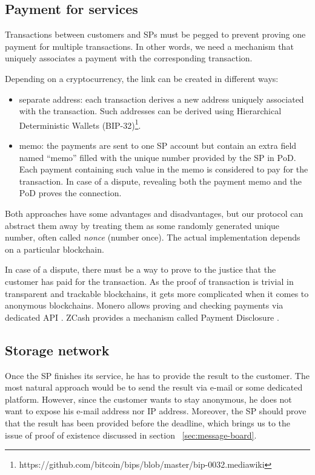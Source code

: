 \documentclass{ieeeaccess}
\begin{document}
\subsection{Payment for services}\label{payment-for-services}
Transactions between customers and SPs must be pegged to prevent proving one payment for multiple transactions. In other
words, we need a mechanism that uniquely associates a payment with the corresponding transaction.

Depending on a cryptocurrency, the link can be created in different
ways:
\begin{itemize}

\item separate address: each transaction derives a new address uniquely associated with the transaction. Such addresses can be derived using Hierarchical Deterministic Wallets (BIP-32)\footnote{https://github.com/bitcoin/bips/blob/master/bip-0032.mediawiki}.
\item memo: the payments are sent to one SP account but contain an extra field named ``memo'' filled with the unique number provided by the SP in $\mathrm{PoD}$. Each payment containing such value in the memo is considered to pay for the transaction. In case of a dispute, revealing both the payment memo and the $\mathrm{PoD}$ proves the connection.
\end{itemize}

Both approaches have some advantages and disadvantages, but our protocol can abstract them away by treating them as some randomly generated unique number, often called \textit{nonce} (number once). The actual implementation depends on a particular blockchain.

In case of a dispute, there must be a way to prove to the justice that the customer has paid for the transaction. As the proof of transaction is trivial in transparent and trackable blockchains, it gets more complicated when it comes to anonymous blockchains. Monero allows proving and checking payments via dedicated API \cite{MoneroHowProve}. ZCash provides a mechanism called Payment Disclosure \cite{daviesIntroductionPaymentDisclosure2017}.

\subsection{Storage network}\label{storage-network}
Once the SP finishes its service, he has to provide the result to the customer. The most natural approach would be to send the result via e-mail or some dedicated platform. However, since the customer wants to stay anonymous, he does not want to expose his e-mail address nor IP address. Moreover, the SP should prove that the result has been provided before the deadline, which brings us to the issue of proof of existence discussed in section ~\ref{sec:message-board}.
\end{document}
